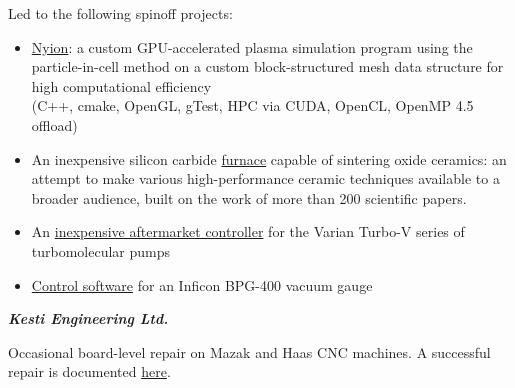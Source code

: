\documentclass[fleqn,11pt]{article}
\newcommand{\ressection}[1]{\textbf{{\Large \textit{#1}}}\xrfill[0.1ex]{0.6pt}}
\begin{document}
Led to the following spinoff projects:
\begin{itemize}\setlength\itemsep{-1em}
	\item \href{https://github.com/0xDBFB7/Nyion}{Nyion}: a custom GPU-accelerated plasma simulation program using the particle-in-cell method on a custom block-structured mesh data structure for high computational efficiency\\
	(C++, cmake, OpenGL, gTest, HPC via CUDA, OpenCL, OpenMP 4.5 offload)
	\item An inexpensive silicon carbide \href{https://0xdbfb7.com/furnace.html}{furnace} capable of sintering oxide ceramics: an attempt to make various high-performance ceramic techniques available to a broader audience, built on the work of more than 200 scientific papers. 
	\item An \href{https://github.com/0xDBFB7/varian-turbo-controller}{inexpensive aftermarket controller} for the Varian Turbo-V series of turbomolecular pumps 
	\item \href{https://gist.github.com/0xDBFB7/7bd7048c6639270e6f291a2673903184}{Control software} for an Inficon BPG-400 vacuum gauge
\end{itemize}

\ressection{Kesti Engineering Ltd.}

Occasional board-level repair on Mazak and Haas CNC machines. A successful repair is documented \href{https://0xdbfb7.com/meldas.html}{here}.




	
%

\end{document}
